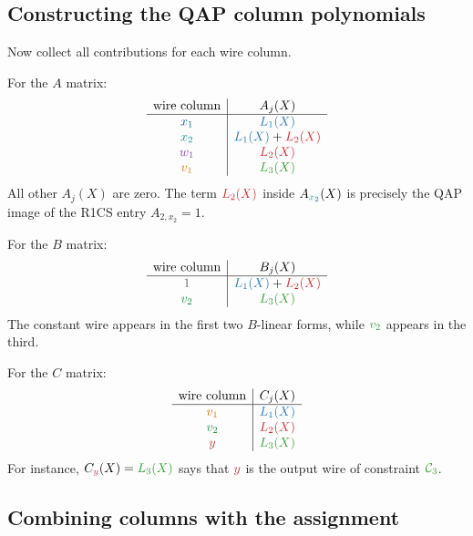 \documentclass[11pt]{article}
\newcommand{\constwire}[1]{\textcolor{wireconstcolor}{#1}}
\newcommand{\xone}[1]{\textcolor{wirexonecolor}{#1}}
\newcommand{\xtwo}[1]{\textcolor{wirextwocolor}{#1}}
\newcommand{\wone}[1]{\textcolor{wirewonecolor}{#1}}
\newcommand{\vone}[1]{\textcolor{wirevonecolor}{#1}}
\newcommand{\vtwo}[1]{\textcolor{wirevtwocolor}{#1}}
\newcommand{\ywire}[1]{\textcolor{wireycolor}{#1}}
\newcommand{\rowone}[1]{\textcolor{rowonecolor}{#1}}
\newcommand{\rowtwo}[1]{\textcolor{rowtwocolor}{#1}}
\newcommand{\rowthree}[1]{\textcolor{rowthreecolor}{#1}}
\begin{document}
\subsection{Constructing the QAP column polynomials}

Now collect all contributions for each wire column.

For the $A$ matrix:
\[
\begin{array}{c|c}
\text{wire column} & A_j(X) \\
\hline
\xone{x_1} & \rowone{L_1(X)} \\
\xtwo{x_2} & \rowone{L_1(X)}+\rowtwo{L_2(X)} \\
\wone{w_1} & \rowtwo{L_2(X)} \\
\vone{v_1} & \rowthree{L_3(X)}
\end{array}
\]
All other $A_j(X)$ are zero. The term $\rowtwo{L_2(X)}$ inside $A_{\xtwo{x_2}}(X)$ is precisely the QAP image of the R1CS entry $A_{2,x_2}=1$.

For the $B$ matrix:
\[
\begin{array}{c|c}
\text{wire column} & B_j(X) \\
\hline
\constwire{1} & \rowone{L_1(X)}+\rowtwo{L_2(X)} \\
\vtwo{v_2} & \rowthree{L_3(X)}
\end{array}
\]
The constant wire appears in the first two $B$-linear forms, while $\vtwo{v_2}$ appears in the third.

For the $C$ matrix:
\[
\begin{array}{c|c}
\text{wire column} & C_j(X) \\
\hline
\vone{v_1} & \rowone{L_1(X)} \\
\vtwo{v_2} & \rowtwo{L_2(X)} \\
\ywire{y} & \rowthree{L_3(X)}
\end{array}
\]
For instance, $C_{\ywire{y}}(X)=\rowthree{L_3(X)}$ says that $\ywire{y}$ is the output wire of constraint $\rowthree{\mathcal C_3}$.

\subsection{Combining columns with the assignment}
\end{document}
